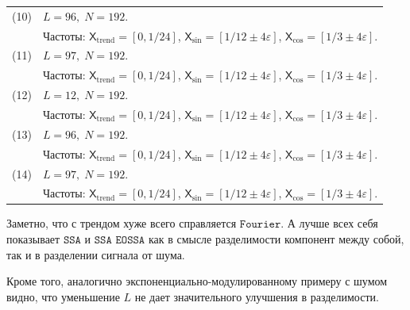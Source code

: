 \documentclass[12pt, specialist, subf
]{disser}
\theoremstyle{definition}
\newcommand{\SSA}{\texttt{SSA}}
\newcommand{\EOSSA}{\texttt{SSA EOSSA}}
\newcommand{\CISSA}{\texttt{CiSSA}}
\newcommand{\FOURIER}{\texttt{Fourier}}
\newcommand{\TS}{\mathsf{X}}
\begin{document}
\begin{table}[H]
\begin{tabularx}{\textwidth}{|c|X|}
    \hline
    (10) & \(L = 96,\; N = 192\). \\
         & Частоты: \(\TS_{\text{trend}} = [0,1/24]\), \(\TS_{\sin} = [1/12\pm4\varepsilon]\), \(\TS_{\cos} = [1/3\pm4\varepsilon]\). \\
    \hline
    (11) & \(L = 97,\; N = 192\). \\
         & Частоты: \(\TS_{\text{trend}} = [0,1/24]\), \(\TS_{\sin} = [1/12\pm4\varepsilon]\), \(\TS_{\cos} = [1/3\pm4\varepsilon]\). \\
    \hline
    (12) & \(L = 12,\; N = 192\). \\
         & Частоты: \(\TS_{\text{trend}} = [0,1/24]\), \(\TS_{\sin} = [1/12\pm4\varepsilon]\), \(\TS_{\cos} = [1/3\pm4\varepsilon]\). \\
    \hline
    (13) & \(L = 96,\; N = 192\). \\
         & Частоты: \(\TS_{\text{trend}} = [0,1/24]\), \(\TS_{\sin} = [1/12\pm4\varepsilon]\), \(\TS_{\cos} = [1/3\pm4\varepsilon]\). \\
    \hline
    (14) & \(L = 97,\; N = 192\). \\
         & Частоты: \(\TS_{\text{trend}} = [0,1/24]\), \(\TS_{\sin} = [1/12\pm4\varepsilon]\), \(\TS_{\cos} = [1/3\pm4\varepsilon]\). \\
    \hline
  \end{tabularx}
\end{table}


Заметно, что с трендом хуже всего справляется $\FOURIER$. А лучше всех себя показывает $\SSA$ и $\EOSSA$ как в смысле разделимости компонент между собой, так и в разделении сигнала от шума.

Кроме того,   аналогично экспоненциально-модулированному примеру с шумом видно, что уменьшение $L$ не дает значительного улучшения в разделимости.



\end{document}
